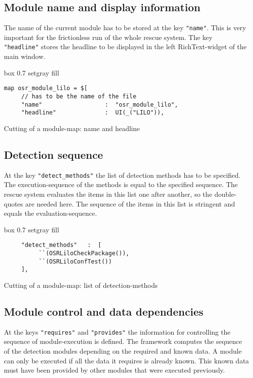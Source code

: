 \subsection{Module name and display information}
The name of the current module has to be stored at the key \verb+"name"+.
This is very important for the frictionless run of the whole rescue system.
The key \verb+"headline"+ stores the headline to be displayed in the left
RichText-widget of the main window.

\begin{program}[h!]
\begin{boxitpara}{box 0.7 setgray fill}
{\footnotesize \begin{verbatim}
map osr_module_lilo = $[
     // has to be the name of the file
     "name"                  :  "osr_module_lilo",
     "headline"              :  UI(_("LILO")),
\end{verbatim}}%
\end{boxitpara}
\caption{Cutting of a module-map: name and headline}
\end{program}

\subsection{Detection sequence}
At the key \verb+"detect_methods"+ the list of detection methods has to
be specified. The execution-sequence of the methods is equal to the 
specified sequence. The rescue system evaluates the items in this list
one after another, so the double-quotes are needed here. The sequence of
the items in this list is stringent and equals the evaluation-sequence.

\begin{program}[h!]
\begin{boxitpara}{box 0.7 setgray fill}
{\footnotesize \begin{verbatim}
     "detect_methods"   :  [
          ``(OSRLiloCheckPackage()),
          ``(OSRLiloConfTest())
     ],
\end{verbatim}}
\end{boxitpara}
\caption{Cutting of a module-map: list of detection-methods}
\label{detect_methods}
\end{program}

\subsection{Module control and data dependencies}
At the keys \verb+"requires"+ and \verb+"provides"+ the information for
controlling the sequence of module-execution is defined. The framework
computes the sequence of the detection modules depending on the required
and known data. A module can only be executed if all the data it requires
is already known. This known data must have been provided by other modules
that were executed previously.\\

